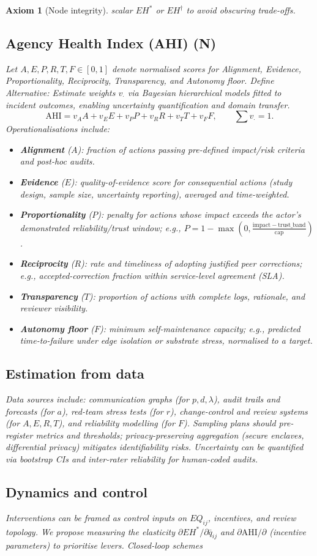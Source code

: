 \documentclass[12pt]{article}
\newtheorem{axiom}{Axiom}
\begin{document}
\begin{axiom}[Node integrity]
scalar $EH^{\ast}$ or $EH^{\dagger}$ to avoid obscuring trade-offs. \subsection{Agency Health Index (AHI) (N)} Let $A,E,P,R,T,F\in[0,1]$ denote normalised scores for Alignment, Evidence, Proportionality, Reciprocity, Transparency, and Autonomy floor. Define \emph{Alternative:} Estimate weights $v_{\cdot}$ via Bayesian hierarchical models fitted to incident outcomes, enabling uncertainty quantification and domain transfer. \begin{equation} \mathrm{AHI}=v_A A+v_E E+v_P P+v_R R+v_T T+v_F F,\qquad \sum v_{\cdot}=1. \end{equation} Operationalisations include: \begin{itemize}[leftmargin=1.2em] \item \textbf{Alignment} ($A$): fraction of actions passing pre-defined impact/risk criteria and post-hoc audits. \item \textbf{Evidence} ($E$): quality-of-evidence score for consequential actions (study design, sample size, uncertainty reporting), averaged and time-weighted. \item \textbf{Proportionality} ($P$): penalty for actions whose impact exceeds the actor's demonstrated reliability/trust window; e.g., $P=1-\max(0,\frac{\mathrm{impact}-\mathrm{trust\_band}}{\mathrm{cap}})$. \item \textbf{Reciprocity} ($R$): rate and timeliness of adopting justified peer corrections; e.g., accepted-correction fraction within service-level agreement (SLA). \item \textbf{Transparency} ($T$): proportion of actions with complete logs, rationale, and reviewer visibility. \item \textbf{Autonomy floor} ($F$): minimum self-maintenance capacity; e.g., predicted time-to-failure under edge isolation or substrate stress, normalised to a target. \end{itemize} \subsection{Estimation from data} Data sources include: communication graphs (for $p,d,\lambda$), audit trails and forecasts (for $a$), red-team stress tests (for $r$), change-control and review systems (for $A,E,R,T$), and reliability modelling (for $F$). Sampling plans should pre-register metrics and thresholds; privacy-preserving aggregation (secure enclaves, differential privacy) mitigates identifiability risks. Uncertainty can be quantified via bootstrap CIs and inter-rater reliability for human-coded audits. \subsection{Dynamics and control} Interventions can be framed as control inputs on $EQ_{ij}$, incentives, and review topology. We propose measuring the elasticity $\partial EH^{\ast}/\partial \bar{q}_{ij}$ and $\partial \mathrm{AHI}/\partial$ (incentive parameters) to prioritise levers. Closed-loop schemes 
\end{axiom}
\end{document}
